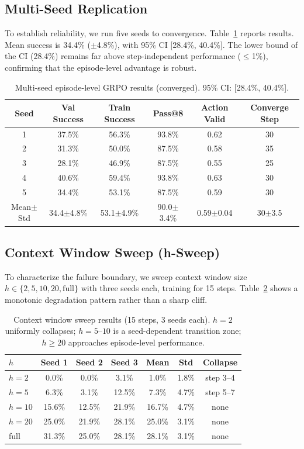 \documentclass[11pt]{article}
\begin{document}
\subsection{Multi-Seed Replication}

To establish reliability, we run five seeds to convergence. Table~\ref{tab:multiseed} reports results. Mean success is 34.4\% ($\pm$4.8\%), with 95\% CI [28.4\%, 40.4\%]. The lower bound of the CI (28.4\%) remains far above step-independent performance ($\leq$1\%), confirming that the episode-level advantage is robust.

\begin{table}[h]
\centering
\caption{Multi-seed episode-level GRPO results (converged). 95\% CI: [28.4\%, 40.4\%].}
\label{tab:multiseed}
\begin{tabular}{cccccc}
\toprule
Seed & Val Success & Train Success & Pass@8 & Action Valid & Converge Step \\
\midrule
1 & 37.5\% & 56.3\% & 93.8\% & 0.62 & 30 \\
2 & 31.3\% & 50.0\% & 87.5\% & 0.58 & 35 \\
3 & 28.1\% & 46.9\% & 87.5\% & 0.55 & 25 \\
4 & 40.6\% & 59.4\% & 93.8\% & 0.63 & 30 \\
5 & 34.4\% & 53.1\% & 87.5\% & 0.59 & 30 \\
\midrule
Mean$\pm$Std & 34.4$\pm$4.8\% & 53.1$\pm$4.9\% & 90.0$\pm$3.4\% & 0.59$\pm$0.04 & 30$\pm$3.5 \\
\bottomrule
\end{tabular}
\end{table}

\subsection{Context Window Sweep (h-Sweep)}
\label{sec:hsweep}

To characterize the failure boundary, we sweep context window size $h \in \{2, 5, 10, 20, \text{full}\}$ with three seeds each, training for 15 steps. Table~\ref{tab:hsweep} shows a monotonic degradation pattern rather than a sharp cliff.

\begin{table}[h]
\centering
\caption{Context window sweep results (15 steps, 3 seeds each). $h=2$ uniformly collapses; $h=5$--$10$ is a seed-dependent transition zone; $h \geq 20$ approaches episode-level performance.}
\label{tab:hsweep}
\begin{tabular}{lcccccc}
\toprule
$h$ & Seed 1 & Seed 2 & Seed 3 & Mean & Std & Collapse \\
\midrule
$h=2$ & 0.0\% & 0.0\% & 3.1\% & 1.0\% & 1.8\% & step 3--4 \\
$h=5$ & 6.3\% & 3.1\% & 12.5\% & 7.3\% & 4.7\% & step 5--7 \\
$h=10$ & 15.6\% & 12.5\% & 21.9\% & 16.7\% & 4.7\% & none \\
$h=20$ & 25.0\% & 21.9\% & 28.1\% & 25.0\% & 3.1\% & none \\
full & 31.3\% & 25.0\% & 28.1\% & 28.1\% & 3.1\% & none \\
\bottomrule
\end{tabular}
\end{table}
\end{document}
